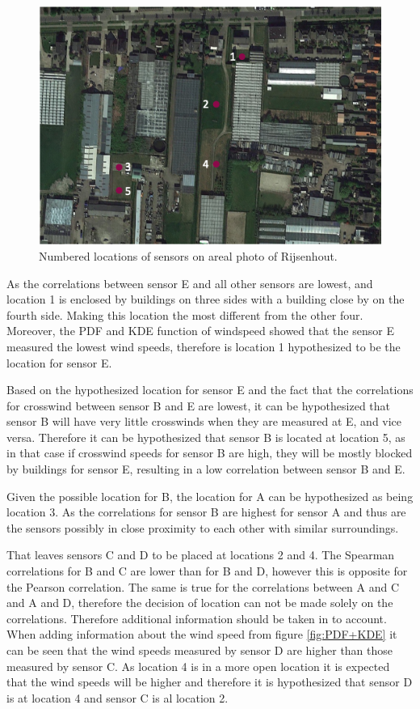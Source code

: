 \documentclass[a4paper,12pt]{article} %
\begin{document}
\begin{enumerate}
 \begin{figure}[H] 
	\centering
	\includegraphics[width=1\textwidth]{Sensor_locations.png} 
	\caption{Numbered locations of sensors on areal photo of Rijsenhout.} 
	\label{fig:sensor_locations}
\end{figure}

As the correlations between sensor E and all other sensors are lowest, and location 1 is enclosed by buildings on three sides with a building close by on the fourth side. Making this location the most different from the other four. Moreover, the PDF and KDE function of windspeed showed that the sensor E measured the lowest wind speeds, therefore is location 1 hypothesized to be the location for sensor E. 

Based on the hypothesized location for sensor E and the fact that the correlations for crosswind between sensor B and E are lowest, it can be hypothesized that sensor B will have very little crosswinds when they are measured at E, and vice versa. Therefore it can be hypothesized that sensor B is located at location 5, as in that case if crosswind speeds for sensor B are high, they will be mostly blocked by buildings for sensor E, resulting in a low correlation between sensor B and E. 

Given the possible location for B, the location for A can be hypothesized as being location 3. As the correlations for sensor B are highest for sensor A and thus are the sensors possibly in close proximity to each other with similar surroundings. 

That leaves sensors C and D to be placed at locations 2 and 4. The Spearman correlations for B and C are lower than for B and D, however this is opposite for the Pearson correlation. The same is true for the correlations between A and C and A and D, therefore the decision of location can not be made solely on the correlations. Therefore additional information should be taken in to account. When adding information about the wind speed from figure \ref{fig:PDF+KDE} it can be seen that the wind speeds measured by sensor D are higher than those measured by sensor C. As location 4 is in a more open location it is expected that the wind speeds will be higher and therefore it is hypothesized that sensor D is at location 4 and sensor C is al location 2. 


\end{enumerate}
\end{document}
